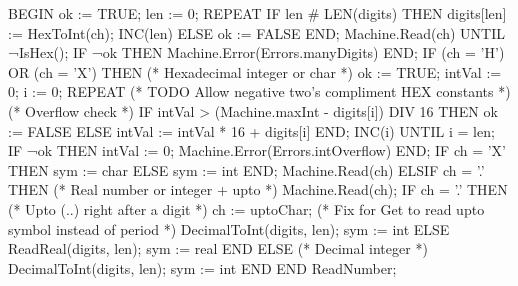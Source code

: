 \documentclass[utf8]{lgu}
\begin{document}
\begin{modula2long}
BEGIN
  ok := TRUE;
  len := 0;
  REPEAT
    IF len # LEN(digits) THEN
      digits[len] := HexToInt(ch);
      INC(len)
    ELSE
      ok := FALSE
    END;
    Machine.Read(ch)
  UNTIL ¬IsHex();
  IF ¬ok THEN
    Machine.Error(Errors.manyDigits)
  END;
  IF (ch = 'H') OR (ch = 'X') THEN (* Hexadecimal integer or char *)
    ok := TRUE;
    intVal := 0;
    i := 0;
    REPEAT (* TODO Allow negative two's compliment HEX constants *)
      (* Overflow check *)
      IF intVal > (Machine.maxInt - digits[i]) DIV 16 THEN
        ok := FALSE
      ELSE
        intVal := intVal * 16 + digits[i]
      END;
      INC(i)
    UNTIL i = len;
    IF ¬ok THEN
      intVal := 0;
      Machine.Error(Errors.intOverflow)
    END;
    IF ch = 'X' THEN sym := char ELSE sym := int END;
    Machine.Read(ch)
  ELSIF ch = '.' THEN (* Real number or integer + upto *)
    Machine.Read(ch);
    IF ch = '.' THEN (* Upto (..) right after a digit *)
      ch := uptoChar; (* Fix for Get to read upto symbol instead of period *)
      DecimalToInt(digits, len);
      sym := int
    ELSE
      ReadReal(digits, len);
      sym := real
    END
  ELSE (* Decimal integer *)
    DecimalToInt(digits, len);
    sym := int
  END
END ReadNumber;


\end{modula2long}
\end{document}
